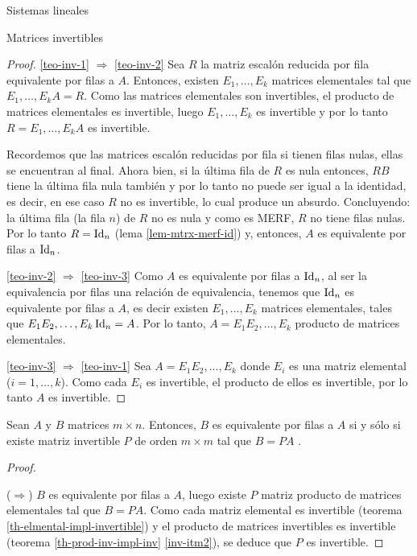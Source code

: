 \begin{chapter}{Sistemas lineales}
\begin{section}{Matrices invertibles}
\begin{proof}
                
                \ref{teo-inv-1} $\Rightarrow$ \ref{teo-inv-2}\; Sea $R$ la matriz escalón reducida por fila equivalente por filas a $A$. Entonces,  existen $E_1,\ldots,E_k$ matrices elementales tal que $E_1,\ldots,E_kA = R$. Como las matrices elementales son invertibles, el producto de matrices elementales es invertible, luego  $E_1,\ldots,E_k$ es invertible y por lo tanto $R=E_1,\ldots,E_kA$ es invertible. 
                
                Recordemos que las matrices escalón reducidas por fila si tienen filas nulas, ellas se encuentran al final.  Ahora bien,  si la última fila de $R$ es nula entonces,  $RB$ tiene la última fila nula también y por lo tanto no puede ser igual a la identidad, es decir, en ese caso $R$ no es invertible, lo cual produce un absurdo. Concluyendo: la última fila (la fila $n$) de $R$ no es nula y como es MERF, $R$ no tiene filas nulas. Por lo tanto $R=\operatorname{Id}_n$ (lema \ref{lem-mtrx-merf-id}) y,  entonces, $A$ es equivalente por filas a $\operatorname{Id}_n$. 
                
                \ref{teo-inv-2} $\Rightarrow$ \ref{teo-inv-3}\; Como $A$  es equivalente por filas a $\operatorname{Id}_n$, al ser la equivalencia por filas una relación de equivalencia,  tenemos que $\operatorname{Id}_n$ es equivalente por filas a $A$, es decir  existen $E_1,\ldots,E_k$ matrices elementales, tales que $E_1E_2,\ldots,E_k\operatorname{Id}_n = A$. Por lo tanto, $A =E_1E_2,\ldots,E_k$ producto de matrices elementales.
                
                \ref{teo-inv-3} $\Rightarrow$ \ref{teo-inv-1} \; Sea $A = E_1E_2,\ldots,E_k$ donde $E_i$  es una matriz elemental ($i=1,\ldots,k$). Como cada $E_i$ es invertible,  el producto de ellos es invertible,  por lo tanto $A$ es invertible.
            \end{proof}	
            
            \begin{corolario}
                Sean $A$ y $B$ matrices $m \times n$. Entonces,   $B$ es equivalente por filas a $A$ si y sólo si existe matriz invertible $P$ de orden $m \times m$ tal que $B =PA$ . 
            \end{corolario}
            \begin{proof}
                
                \
                
                ($\Rightarrow$) $B$ es equivalente por filas a $A$,  luego existe $P$ matriz producto de matrices elementales tal que $B =PA$. Como cada matriz elemental es invertible (teorema \ref{th-elmental-impl-invertible}) y el producto de matrices invertibles es invertible (teorema  \ref{th-prod-inv-impl-inv} \ref{inv-itm2}), se deduce que $P$ es invertible. 
                

\end{proof}
\end{section}
\end{chapter}

